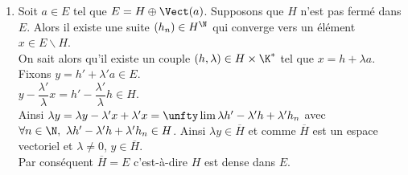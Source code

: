 \documentclass{book}
\begin{document}
\begin{enumerate}[leftmargin=*]
	\underline{$3^{\T{ème}}$ méthode :} (hors-programme)\\
	On montre qu'un sous-espace vectoriel de dimension finie d'un espace vectoriel normé est complet et donc a fortiori fermé (cf. l'exo qui montre que $\R$ est complet \ref{R est complet} : je vais rajouter des questions pour arriver à ce résultat).
	\item Soit $a\in E$ tel que $E=H\oplus\Vect(a)$. Supposons que $H$ n'est pas fermé dans $E$. Alors il existe une suite $(h_n)\in H^\N$ qui converge vers un élément $x\in E\backslash H$.\\
	On sait alors qu'il existe un couple $(h,\lambda)\in H\times\K^*$ tel que $x=h+\lambda a$. Fixons $y=h'+\lambda'a\in E$.\\
	$y-\dfrac{\lambda'}{\lambda}x=h'-\dfrac{\lambda'}{\lambda}h\in H$.\\
	Ainsi $\lambda y=\lambda y-\lambda'x+\lambda'x=\unfty\lim \lambda h'-\lambda'h+\lambda' h_n$ avec $\forall n\in \N,\ \lambda h'-\lambda'h+\lambda'h_n\in H$. Ainsi $\lambda y\in\overline H$ et comme $\overline H$ est un espace vectoriel et $\lambda\ne 0$, $y\in \overline H$.\\
	Par conséquent $\overline H=E$ c'est-à-dire $H$ est dense dans $E$.
	\end{enumerate}
	
\end{document}
